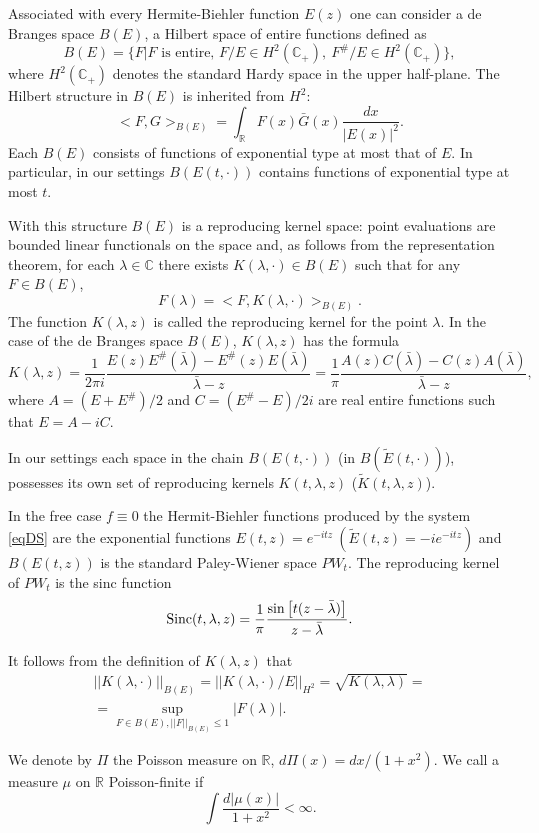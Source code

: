 \documentclass[11pt,twoside,reqno]{amsart}
\def\ti{\tilde}
\def\R{{\mathbb R}}
\def\C{{\mathbb{C}}}
\def\l{\lambda}
\def\S{\text{\rm Sinc}}
\theoremstyle{plain}
\numberwithin{equation}{section}
\begin{document}
Associated with every Hermite-Biehler function $E(z)$ one can consider a de Branges space $B(E)$, a Hilbert space of entire functions defined as
$$B(E)=\{F| F\text{ is entire, }F/E\in H^2(\C_+),\ F^\#/E\in H^2(\C_+)\},$$
where $H^2(\C_+)$ denotes the standard Hardy space in the upper half-plane. The Hilbert structure in $B(E) $ is inherited from $H^2$:
$$<F,G>_{B(E)}=\int_{\R}F(x)\bar G(x)\frac{dx}{|E(x)|^2}.$$
Each $B(E)$ consists of functions of exponential type at most that of $E$. In particular, in our settings $B(E(t,\cdot))$ contains functions
of exponential type at most $t$.

With this structure $B(E)$ is a reproducing kernel space: point evaluations are bounded linear functionals on the space and, as follows from  the representation theorem, for each $\l\in\C$ there exists $K(\l,\cdot)\in B(E)$ such that for any $F\in B(E)$,
$$F(\l)=<F,K(\l,\cdot)>_{B(E)}.$$
The function $K(\l,z)$ is called the reproducing kernel for the point $\l$. In the case of the de Branges space $B(E)$, $K(\l,z)$  has the formula
$$K(\l,z)=\frac{1}{2\pi i}\frac{  E(z) E^\#(\bar \l)- E^\#(z)E(\bar \l)}{\bar \l -z }=\frac{1}{\pi }\frac{A(z) C(\bar \l) - C(z)A(\bar \l)}{\bar \l-z},
$$
where $A=(E+E^\#)/2$ and $C=(E^\#-E)/2i$ are real entire functions such that $E=A-iC$.

In our settings each space  in the chain $B(E(t,\cdot))$ (in $B(\ti E(t,\cdot))$), possesses its own set of
reproducing kernels $K(t,\l,z)$ ($\ti K(t,\l,z)$).

In the free case $f\equiv 0$ the Hermit-Biehler functions produced by the system \eqref{eqDS} are the exponential functions $E(t,z)=e^{-itz}
\ (\ti E(t,z)=-ie^{-itz})$ and $B(E(t,z))$ is the standard Paley-Wiener space $PW_t$. The reproducing
kernel of $PW_t$ is the sinc function
\begin{equation}\S(t,\l,z)=\frac 1\pi\frac{\sin \left[t(z-\bar\l)\right]}{z-\bar\l}.\label{eqsinc}\end{equation}

It follows from the definition of $K(\l,z)$ that
\begin{equation}\begin{gathered}||K(\l,\cdot)||_{B(E)}=||K(\l,\cdot)/E||_{H^2}=\sqrt{K(\l,\l)}= \\
=\sup_{F\in B(E), ||F||_{B(E)}\leq 1}|F(\l)|.\label{eq1700}\end{gathered}\end{equation}

We denote by $\Pi$ the Poisson measure on $\R$, $d\Pi(x)=dx/(1+x^2)$.
We call a measure $\mu$ on $\R$ Poisson-finite if
$$\int\frac{d|\mu(x)|}{1+x^2}<\infty.$$
\end{document}
